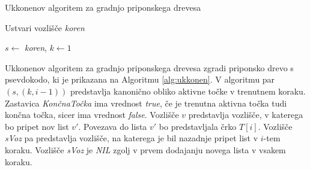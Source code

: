 \begin{algorithm}[tb]

    \caption{Ukkonenov algoritem za gradnjo priponskega drevesa}\label{alg:ukkonen}
    {
        {Ustvari vozlišče \textit{koren}}
        
        {$s\leftarrow$ \textit{koren}, $k\leftarrow 1$}
        
        
    }
\end{algorithm}

Ukkonenov algoritem za gradnjo priponskega drevesa zgradi priponsko drevo s psevdokodo, ki je prikazana na Algoritmu \ref{alg:ukkonen}.
V algoritmu par $(s, (k,i-1))$ predstavlja kanonično obliko aktivne točke v trenutnem koraku. Zastavica \textit{KončnaTočka} ima vrednost \textit{true}, če je trenutna aktivna točka tudi končna točka, sicer ima vrednost \textit{false}. Vozlišče $v$ predstavlja vozlišče, v katerega bo pripet nov list $v'$. Povezava do lista $v'$ bo predstavljala črko $T[i]$. Vozlišče \textit{sVoz} pa predstavlja vozlišče, na katerega je bil nazadnje pripet list v $i$-tem koraku. Vozlišče \textit{sVoz} je \textit{NIL} zgolj v prvem dodajanju novega lista v vsakem koraku.


